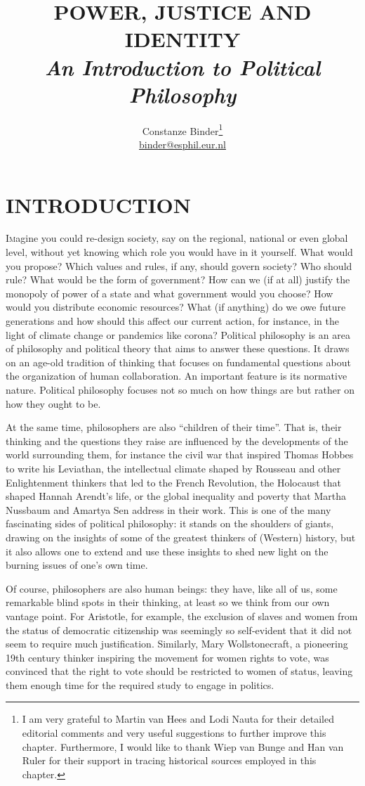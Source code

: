 \documentclass[11pt]{article}
\date{}
\title{\textbf{POWER, JUSTICE AND IDENTITY\\
    \textit{\Large An Introduction to Political Philosophy}}}
\author{Constanze Binder\footnote{ I am very grateful to Martin van Hees and Lodi Nauta for their detailed editorial comments and very useful suggestions to further improve this chapter. Furthermore, I would like to thank Wiep van Bunge and Han van Ruler for their support in tracing historical sources employed in this chapter.}\\
\href{mailto:binder@esphil.eur.nl}{binder@esphil.eur.nl}}
\begin{document}
\maketitle
\section{INTRODUCTION}
\lettrine[lines=3]{I}
magine you could re-design society, say on the regional, national or even global level, without yet knowing which role you would have in it yourself. What would you propose? Which values and rules, if any, should govern society?
Who should rule? What would be the form of government? How can we (if at all) justify the monopoly of power of a state and what government would you choose? How would you distribute economic resources? What (if anything) do we owe future generations and how should this affect our current action, for instance, in the light of climate change or pandemics like corona?
Political philosophy is an area of philosophy and political theory that aims to answer these questions. It draws on an age-old tradition of thinking that focuses on fundamental questions about the organization of human collaboration. An important feature is its normative nature. Political philosophy focuses not so much on how things are but rather on how they ought to be.

At the same time, philosophers are also “children of their time”. That is, their thinking and the questions they raise are influenced by the developments of the world surrounding them, for instance the civil war that inspired Thomas Hobbes to write his Leviathan, the intellectual climate shaped by Rousseau and other Enlightenment thinkers that led to the French Revolution, the Holocaust that shaped Hannah Arendt’s life, or the global inequality and poverty that Martha Nussbaum and Amartya Sen address in their work. This is one of the many fascinating sides of political philosophy: it stands on the shoulders of giants, drawing on the insights of some of the greatest thinkers of (Western) history, but it also allows one to extend and use these insights to shed new light on the burning issues of one’s own time.


Of course, philosophers are also human beings: they have, like all of us, some remarkable blind spots in their thinking, at least so we think from our own vantage point. For Aristotle, for example, the exclusion of slaves and women from the status of democratic citizenship was seemingly so self-evident that it did not seem to require much justification. Similarly, Mary Wollstonecraft, a pioneering 19th century thinker inspiring the movement for women rights to vote, was convinced that the right to vote should be restricted to women of status, leaving them enough time for the required study to engage in politics.
\end{document}
